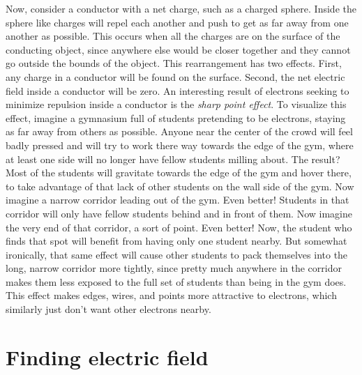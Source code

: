 \documentclass[nobib]{tufte-handout}
\begin{document}
Now, consider a conductor with a net charge, such as a charged sphere.
Inside the sphere like charges will repel each another and push 
to get as far away from one another as possible. This occurs when
all the charges are on the surface of the conducting object, since anywhere 
else would be closer together and they cannot go outside the 
bounds of the object. This rearrangement has two effects.
First, any charge in a conductor will be found on the surface.
Second, the net electric field inside a conductor will be zero. 
An interesting result of electrons seeking to minimize repulsion inside a conductor is 
the \emph{sharp point effect}. To visualize this effect, imagine a gymnasium full of students 
pretending to be electrons, staying as far away from others as possible. 
Anyone near the center of the crowd will feel badly pressed and will try 
to work there way towards the edge of the gym, where at least one side 
will no longer have fellow students milling about. The result? 
Most of the students will gravitate towards the edge of the gym 
and hover there, to take advantage of that lack of other students 
on the wall side of the gym. Now imagine a narrow corridor leading out of the gym. 
Even better! Students in that corridor will only have 
fellow students behind and in front of them.
Now imagine the very end of that corridor, a sort of point. 
Even better! Now, the student who finds that spot will benefit 
from having only one student nearby. But somewhat ironically, 
that same effect will cause other students to pack themselves 
into the long, narrow corridor more tightly, since pretty 
much anywhere in the corridor makes them less exposed to the 
full set of students than being in the gym does.
This effect makes edges, wires, and points more attractive to electrons, 
which similarly just don't want other electrons nearby.

\section{Finding electric field}
\end{document}

